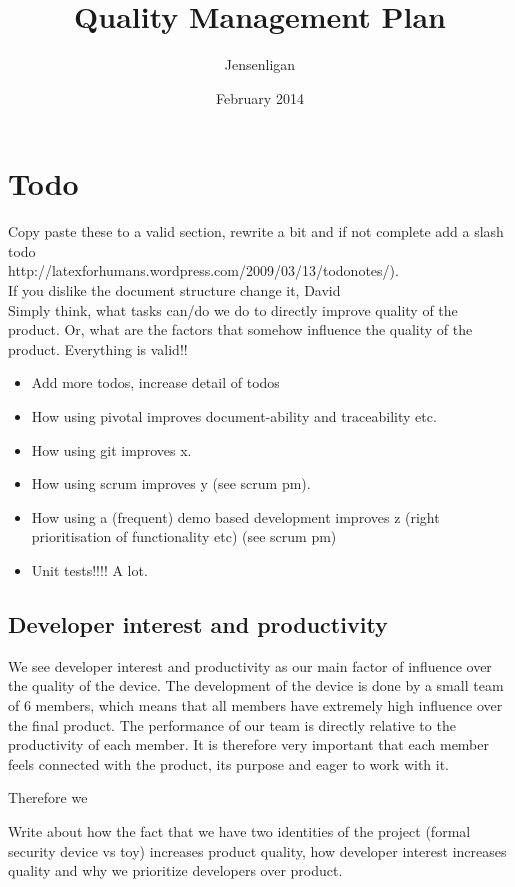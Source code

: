 \documentclass{article}
\title{Quality Management Plan}
\author{Jensenligan}
\date{February 2014}
\begin{document}
\maketitle

\section{Todo}


Copy paste these to a valid section, rewrite a bit and if not complete add a slash todo \\
http://latexforhumans.wordpress.com/2009/03/13/todonotes/).\\If you dislike the document structure change it, David
\\
Simply think, what tasks can/do we do to directly improve quality of the product. Or, what are the factors that somehow influence the quality of the product. Everything is valid!!
\begin{itemize}
\item Add more todos, increase detail of todos
\item How using pivotal improves document-ability and traceability etc.
\item How using git improves x.
\item How using scrum improves y (see scrum pm).
\item How using a (frequent) demo based development improves z (right prioritisation of functionality etc) (see scrum pm)
\item Unit tests!!!! A lot.
\end{itemize}


\subsection{Developer interest and productivity}
We see developer interest and productivity as our main factor of influence over the quality of the device. The development of the device is done by a small team of 6 members, which means that all members have extremely high influence over the final product. The performance of our team is directly relative to the productivity of each member. It is therefore very important that each member feels connected with the product, its purpose and eager to work with it. 

Therefore we 


Write about how the fact that we have two identities of the project (formal security device vs toy) increases product quality, how developer interest increases quality and why we prioritize developers over product.
\end{document}
